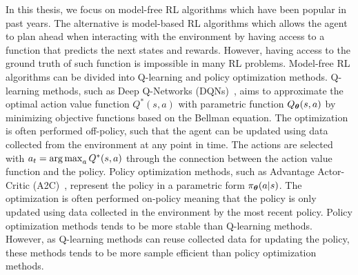 In this thesis, we focus on model-free RL algorithms which have been popular in past years. The alternative is model-based RL algorithms which allows the agent to plan ahead when interacting with the environment by having access to a function that predicts the next states and rewards. However, having access to the ground truth of such function is impossible in many RL problems. Model-free RL algorithms can be divided into Q-learning and policy optimization methods. Q-learning methods, such as Deep Q-Networks (DQNs)~\cite{mnih2013playing, mnih2015human}, aims to approximate the optimal action value function $Q^{*}(s, a)$ with parametric function $Q_{{\bm{\theta}}}(s, a)$ by minimizing objective functions based on the Bellman equation. The optimization is often performed off-policy, such that the agent can be updated using data collected from the environment at any point in time. The actions are selected with $a_t = \operatorname*{arg\,max}_{a} Q^{*}(s, a)$ through the connection between the action value function and the policy.  
Policy optimization methods, such as Advantage Actor-Critic (A2C)~\cite{mnih2016asynchronous},  represent the policy in a parametric form $\pi_{{\bm{\theta}}}(a | s)$. The optimization is often performed on-policy meaning that the policy is only updated using data collected in the environment by the most recent policy. Policy optimization methods tends to be more stable than Q-learning methods. However, as Q-learning methods can reuse collected data for updating the policy, these methods tends to be more sample efficient than policy optimization methods.



